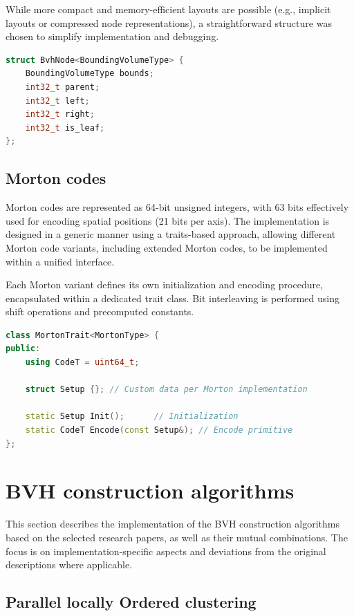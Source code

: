 While more compact and memory-efficient layouts are possible (e.g., implicit layouts or compressed node representations), a straightforward structure was chosen to simplify implementation and debugging.

\begin{lstlisting}[language=C++, caption=BVH node representation]
struct BvhNode<BoundingVolumeType> {
    BoundingVolumeType bounds;
    int32_t parent;
    int32_t left; 
    int32_t right;
    int32_t is_leaf;
};
\end{lstlisting}

\subsection{Morton codes}

Morton codes are represented as 64-bit unsigned integers, with 63 bits effectively used for encoding spatial positions (21 bits per axis). The implementation is designed in a generic manner using a traits-based approach, allowing different Morton code variants, including extended Morton codes, to be implemented within a unified interface.

Each Morton variant defines its own initialization and encoding procedure, encapsulated within a dedicated trait class. Bit interleaving is performed using shift operations and precomputed constants.

\begin{lstlisting}[language=C++, caption=Morton code trait representation]
class MortonTrait<MortonType> {
public:
    using CodeT = uint64_t;

    struct Setup {}; // Custom data per Morton implementation

    static Setup Init();      // Initialization
    static CodeT Encode(const Setup&); // Encode primitive
};
\end{lstlisting}
\section{BVH construction algorithms}

This section describes the implementation of the BVH construction algorithms based on the selected research papers, as well as their mutual combinations. The focus is on implementation-specific aspects and deviations from the original descriptions where applicable.

\subsection{Parallel locally Ordered clustering}


